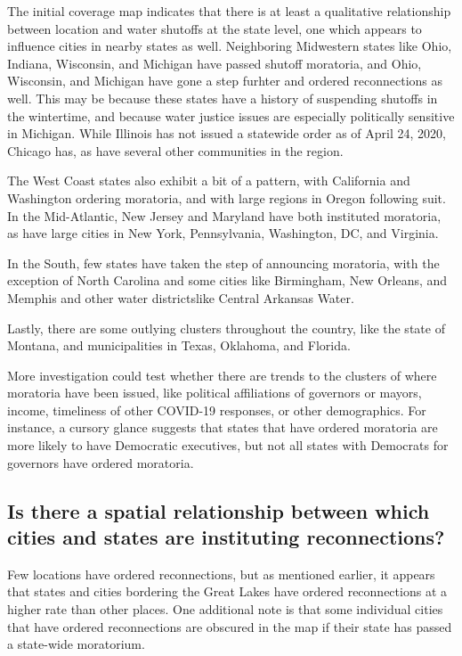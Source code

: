 \documentclass[
  12pt,
]{article}
\begin{document}
The initial coverage map indicates that there is at least a qualitative
relationship between location and water shutoffs at the state level, one
which appears to influence cities in nearby states as well. Neighboring
Midwestern states like Ohio, Indiana, Wisconsin, and Michigan have
passed shutoff moratoria, and Ohio, Wisconsin, and Michigan have gone a
step furhter and ordered reconnections as well. This may be because
these states have a history of suspending shutoffs in the wintertime,
and because water justice issues are especially politically sensitive in
Michigan. While Illinois has not issued a statewide order as of April
24, 2020, Chicago has, as have several other communities in the region.

The West Coast states also exhibit a bit of a pattern, with California
and Washington ordering moratoria, and with large regions in Oregon
following suit. In the Mid-Atlantic, New Jersey and Maryland have both
instituted moratoria, as have large cities in New York, Pennsylvania,
Washington, DC, and Virginia.

In the South, few states have taken the step of announcing moratoria,
with the exception of North Carolina and some cities like Birmingham,
New Orleans, and Memphis and other water districtslike Central Arkansas
Water.

Lastly, there are some outlying clusters throughout the country, like
the state of Montana, and municipalities in Texas, Oklahoma, and
Florida.

More investigation could test whether there are trends to the clusters
of where moratoria have been issued, like political affiliations of
governors or mayors, income, timeliness of other COVID-19 responses, or
other demographics. For instance, a cursory glance suggests that states
that have ordered moratoria are more likely to have Democratic
executives, but not all states with Democrats for governors have ordered
moratoria.

\hypertarget{is-there-a-spatial-relationship-between-which-cities-and-states-are-instituting-reconnections}{%
\subsection{Is there a spatial relationship between which cities and
states are instituting
reconnections?}\label{is-there-a-spatial-relationship-between-which-cities-and-states-are-instituting-reconnections}}

Few locations have ordered reconnections, but as mentioned earlier, it
appears that states and cities bordering the Great Lakes have ordered
reconnections at a higher rate than other places. One additional note is
that some individual cities that have ordered reconnections are obscured
in the map if their state has passed a state-wide moratorium.
\end{document}
